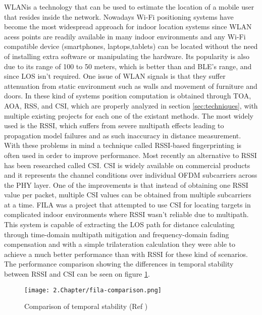 \ac{WLAN}is a technology that can be used to estimate the location of a mobile user that resides inside the network. Nowadays Wi-Fi positioning systems have become the most widespread approach for indoor location systems since \ac{WLAN} acess points are readily available in many indoor environments and any Wi-Fi compatible device (smartphones, laptops,tablets) can be located without the need of installing extra software or manipulating the hardware. Its popularity is also due to its range of 100 to 50 meters, which is better than  and BLE's range, and since \ac{LOS} isn't required. One issue of \ac{WLAN} signals is that they suffer attenuation from static environment such as walls and movement of furniture and doors. In these kind of systems position computation is obtained through TOA, AOA, RSS, and CSI, which are properly analyzed in section \ref{sec:techniques}, with multiple existing projects for each one of the existant methods. The most widely used is the \ac{RSSI}, which suffers from severe multipath effects leading to propagation model failures and as such inaccuracy in distance measurement. With these problems in mind a technique called RSSI-based fingerprinting is often used in order to improve performance.
Most recently an alternative to RSSI has been researched called \ac{CSI}. \ac{CSI} is widely available on commercial products and it represents the channel conditions over individual OFDM subcarriers across the \ac{PHY} layer. One of the improvements is that instead of obtaining one \ac{RSSI} value per packet, multiple \ac{CSI} values can be obtained from multiple subcarriers at a time. FILA \cite{fila} was a project that attempted to use \ac{CSI} for locating targets in complicated indoor environments where RSSI wasn't reliable due to multipath. This system is capable of extracting the \ac{LOS} path for distance calculating through time-domain multipath mitigation and frequency-domain fading compensation and with a simple trilateration calculation they were able to achieve a much better performance than with \ac{RSSI} for these kind of scenarios. The performance comparison showing the differences in temporal stability between \ac{RSSI} and \ac{CSI} can be seen on figure \ref{fig:fila}.

\begin{figure}[H]
	\centering
		\texttt{[image: 2.Chapter/fila-comparison.png]}
	\caption[Comparison of temporal stability (Ref \cite{fila}) ]{Comparison of temporal stability (Ref \cite{fila})}
	\label{fig:fila}
\end{figure}

